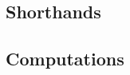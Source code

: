 \subsection{Shorthands}     \label{system transaction: computations: shorthand}          
\subsection{Computations}   \label{system transaction: computations: computations}       

